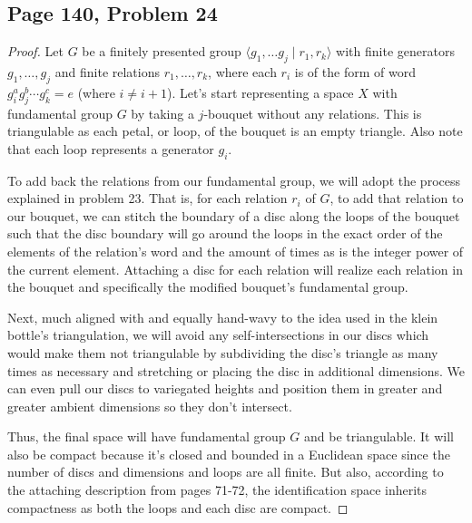 \subsection*{Page 140, Problem 24}
\vspace{15pt}
\begin{proof}
    \vspace{-10pt}
    Let $G$ be a finitely presented group $\langle g_1, \ldots g_j \mid r_1, r_k \rangle$ with finite generators $g_1, \ldots, g_j$ and finite relations $r_1, \ldots, r_k$, where each $r_i$ is of the form of word $g_i^ag_j^b\cdots g_k^c = e$ (where $i \neq i+1$). Let's start representing a space $X$ with fundamental group $G$ by taking a $j$-bouquet without any relations. This is triangulable as each petal, or loop, of the bouquet is an empty triangle. Also note that each loop represents a generator $g_i$.
    
    To add back the relations from our fundamental group, we will adopt the process explained in problem 23. That is, for each relation $r_i$ of $G$, to add that relation to our bouquet, we can stitch the boundary of a disc along the loops of the bouquet such that the disc boundary will go around the loops in the exact order of the elements of the relation's word and the amount of times as is the integer power of the current element. Attaching a disc for each relation will realize each relation in the bouquet and specifically the modified bouquet's fundamental group.
    
    Next, much aligned with and equally hand-wavy to the idea used in the klein bottle's triangulation, we will avoid any self-intersections in our discs which would make them not triangulable by subdividing the disc's triangle as many times as necessary and stretching or placing the disc in additional dimensions. We can even pull our discs to variegated heights and position them in greater and greater ambient dimensions so they don't intersect.
    
    Thus, the final space will have fundamental group $G$ and be triangulable. It will also be compact because it's closed and bounded in a Euclidean space since the number of discs and dimensions and loops are all finite. But also, according to the attaching description from pages 71-72, the identification space inherits compactness as both the loops and each disc are compact. 
\end{proof}